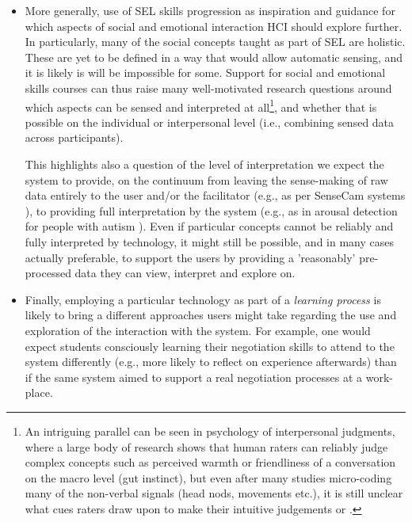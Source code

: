 \documentclass[prodmode,acmtochi]{acmsmall}
\begin{document}
\begin{itemize}
	\item More generally, use of SEL skills progression as inspiration and guidance for which aspects of social and emotional interaction HCI should explore further. In particularly, many of the social concepts taught as part of SEL are holistic. These are yet to be defined in a way that would allow automatic sensing, and it is likely is will be impossible for some. Support for social and emotional skills courses can thus raise many well-motivated research questions around which aspects can be sensed and interpreted at all\footnote{An intriguing parallel can be seen in psychology of interpersonal judgments, where a large body of research shows that human raters can reliably judge complex concepts such as perceived warmth or friendliness of a conversation on the macro level (gut instinct), but even after many studies micro-coding many of the non-verbal signals (head nods, movements etc.), it is still unclear what cues raters draw upon to make their intuitive judgements \cite{Ambady2000} or \cite[p.299]{harrigan2008}.}, and whether that is possible on the individual or interpersonal level (i.e., combining sensed data across participants).

This highlights also a question of the level of interpretation we expect the system to provide, on the continuum from leaving the sense-making of raw data entirely to the user and/or the facilitator (e.g., as per SenseCam systems \cite{Fleck2009}), to providing full interpretation by the system (e.g., as in arousal detection for people with autism \cite{Picard2009}). Even if particular concepts cannot be reliably and fully interpreted by technology, it might still be possible, and in many cases actually preferable, to support the users by providing a 'reasonably' pre-processed data they can view, interpret and explore on. 
\medskip 
	
	\item Finally, employing a particular technology as part of a \emph{learning process} is likely to bring a different approaches users might take regarding the use and exploration of the interaction with the system. For example, one would expect students consciously learning their negotiation skills to attend to the system differently (e.g., more likely to reflect on experience afterwards) than if the same system aimed to support a real negotiation processes at a work-place. 



\end{itemize}
\end{document}
